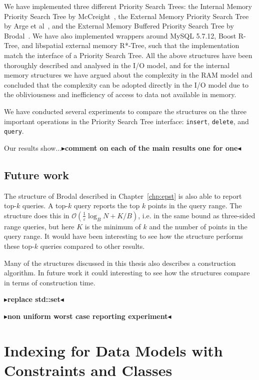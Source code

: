 \documentclass[twoside,11pt,openright]{report}
\def \epsilon {\varepsilon}
\newcommand{\todo}[1]{{\color[rgb]{.5,0,0}\textbf{$\blacktriangleright$#1$\blacktriangleleft$}}}
\begin{document}
We have implemented three different Priority Search Trees: the Internal Memory Priority Search Tree by McCreight~\cite{DBLP:journals/siamcomp/McCreight85}, the External Memory Priority Search Tree by Arge et al~\cite{arge_samoladas_vitter_1999}, and the External Memory Buffered Priority Search Tree by Brodal~\cite{DBLP:journals/corr/Brodal15}. We have also implemented wrappers around MySQL 5.7.12, Boost R-Tree, and libspatial external memory R*-Tree, such that the implementation match the interface of a Priority Search Tree. All the above structures have been thoroughly described and analysed in the I/O model, and for the internal memory structures we have argued about the complexity in the RAM model and concluded that the complexity can be adopted directly in the I/O model due to the obliviousness and inefficiency of access to data not available in memory.

We have conducted several experiments to compare the structures on the three important operations in the Priority Search Tree interface: \texttt{insert}, \texttt{delete}, and \texttt{query}.

Our results show...\todo{comment on each of the main results one for one}

\section{Future work}
The structure of Brodal described in Chapter~\ref{chp:epst} is also able to report top-$k$ queries. A top-$k$ query reports the top $k$ points in the query range. The structure does this in $\mathcal{O}(\frac{1}{\epsilon}\log_B N + K/B)$, i.e. in the same bound as three-sided range queries, but here $K$ is the minimum of $k$ and the number of points in the query range. It would have been interesting to see how the structure performs these top-$k$ queries compared to other results.

Many of the structures discussed in this thesis also describes a construction algorithm. In future work it could interesting to see how the structures compare in terms of construction time.

\todo{replace std::set}

\todo{non uniform worst case reporting experiment}

\clearpage
{}


\clearpage

\appendix

\chapter{Indexing for Data Models with Constraints and Classes}
\label{chp:kanellakis}
\end{document}
